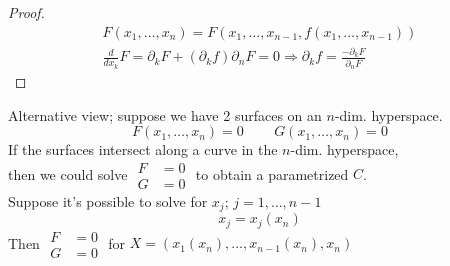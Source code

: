 \documentclass[twoside]{amsart}
\theoremstyle{plain}
\theoremstyle{definition}
\begin{document}
\begin{proof} 
\[
\begin{gathered}
  F(x_1,\dots, x_n) = F(x_1, \dots, x_{n-1}, f(x_1, \dots, x_{n-1} ) ) \\
  \frac{d}{dx_k} F = \partial_k F + (\partial_k f) \partial_n F = 0 \Longrightarrow \partial_k f = \frac{ - \partial_k F }{ \partial_n F }
\end{gathered}
\]
\end{proof} 

Alternative view; suppose we have 2 surfaces on an $n$-dim. hyperspace.  
\[
F(x_1, \dots, x_n) = 0 \quad \quad \, G(x_1,\dots, x_n) = 0 
\]
If the surfaces intersect along a curve in the $n$-dim. hyperspace,  \\
\phantom{ If th} then we could solve $\begin{aligned} F & =0 \\ G & = 0 \end{aligned}$ to obtain a parametrized $C$.   \\

Suppose it's possible to solve for $x_j$; $j=1, \dots, n-1$
\[
x_j = x_j(x_n)
\]
Then $\begin{aligned} F & = 0 \\ G & = 0 \end{aligned}$ for $X = (x_1(x_n), \dots, x_{n-1}(x_n), x_n )$  
\end{document}
